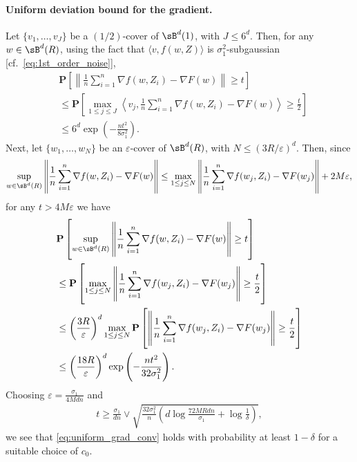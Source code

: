 \documentclass[final,12pt]{colt2018}
\numberwithin{equation}{section}
\numberwithin{equation}{section}
\def\PP{\mathbf{P}}
\def\ave#1{\langle #1 \rangle}
\def\eps{\varepsilon}
\begin{document}
\paragraph{Uniform deviation bound for the gradient.}
Let $\{v_1,\ldots,v_J\}$ be a $(1/2)$-cover of $\sB^d(1)$, with $J \le 6^d$. Then, for any $w \in \sB^d(R)$, using the fact that $\ave{v,f(w,Z)}$ is $\sigma^2_1$-subgaussian [cf.~\eqref{eq:1st_order_noise}],
\begin{align*}
&	\PP\left[\left\| \frac{1}{n}\sum^n_{i=1}\nabla f(w,Z_i) - \nabla F(w)\right\| \ge t \right] \\
& \le \PP\left[ \max_{1 \le j \le J} \left\langle v_j, \frac{1}{n}\sum^n_{i=1}\nabla f(w,Z_i)-\nabla F(w)\right\rangle \ge \frac{t}{2}\right] \\
& \le 6^d \exp\left(-\frac{nt^2}{8\sigma^2_1}\right).
\end{align*}
Next, let $\{w_1,\ldots,w_N\}$ be an $\eps$-cover of $\sB^d(R)$, with $N \le (3R/\eps)^d$. Then, since
\begin{align*}
	\sup_{w \in \sB^d(R)}\left\| \frac{1}{n}\sum^n_{i=1}\nabla f(w,Z_i) - \nabla F(w)\right\| \le \max_{1 \le j \le N} \left\|\frac{1}{n}\sum^n_{i=1}\nabla f(w_j,Z_i) - \nabla F(w_j)\right\| + 2M\eps,
\end{align*}
for any $t > 4M\eps$ we have
\begin{align*}
&	\PP\left[ \sup_{w \in \sB^d(R)}\left\| \frac{1}{n}\sum^n_{i=1}\nabla f(w,Z_i) - \nabla F(w)\right\| \ge t \right] \\
&\le \PP\left[ \max_{1 \le j \le N}\left\| \frac{1}{n}\sum^n_{i=1}\nabla f(w_j,Z_i) - \nabla F(w_j)\right\| \ge \frac{t}{2} \right]  \\
&\le \left(\frac{3R}{\eps}\right)^d \max_{1 \le j \le N} \PP\left[\left\| \frac{1}{n}\sum^n_{i=1}\nabla f(w_j,Z_i) - \nabla F(w_j)\right\| \ge \frac{t}{2} \right] \\
&\le \left(\frac{18R}{\eps}\right)^d \exp\left(-\frac{nt^2}{32\sigma^2_1}\right).
\end{align*}
Choosing $\eps = \frac{\sigma_1}{4Mdn}$ and
\begin{align*}
	t \ge \frac{\sigma_1}{dn} \vee \sqrt{\frac{32\sigma^2_1}{n}\left(d \log \frac{72MRdn}{\sigma_1}+\log\frac{1}{\delta}\right)},
\end{align*}
we see that \eqref{eq:uniform_grad_conv} holds with probability at least $1-\delta$ for a suitable choice of $c_0$.
\end{document}
